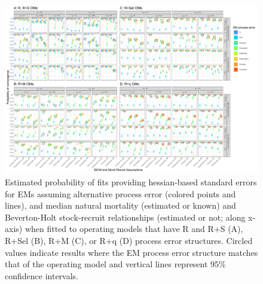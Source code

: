 \documentclass[
  12pt,
]{article}
\begin{document}
\begin{landscape}
\begin{figure}
\begin{center}
\includegraphics{type_4_convergence_plots}
\end{center}
\caption{Estimated probability of fits providing hessian-based standard errors for EMs assuming alternative process error (colored points and lines), and median natural mortality (estimated or known) and Beverton-Holt stock-recruit relationships (estimated or not; along x-axis) when fitted to operating models that have R and R+S (A), R+Sel (B), R+M (C), or R+q (D) process error structures. Circled values indicate results where the EM process error structure matches that of the operating model and vertical lines represent 95\% confidence intervals.}\label{hessian_SE_convergence}
\end{figure}
\end{landscape}

\clearpage
\end{document}
